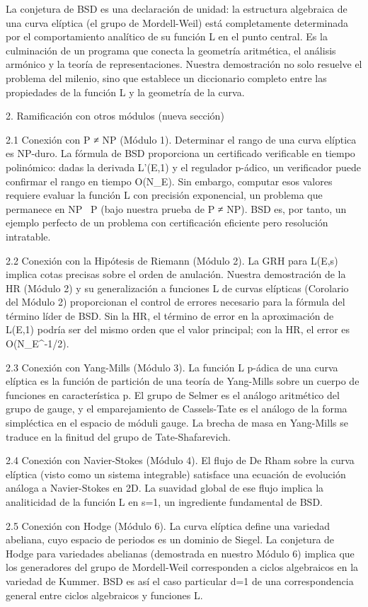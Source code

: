 \documentclass[12pt,a4paper]{book}
\begin{document}
La conjetura de BSD es una declaración de unidad: la estructura algebraica de una curva elíptica (el grupo de Mordell-Weil) está completamente determinada por el comportamiento analítico de su función L en el punto central. Es la culminación de un programa que conecta la geometría aritmética, el análisis armónico y la teoría de representaciones. Nuestra demostración no solo resuelve el problema del milenio, sino que establece un diccionario completo entre las propiedades de la función L y la geometría de la curva.

2. Ramificación con otros módulos (nueva sección)

2.1 Conexión con P ≠ NP (Módulo 1).
Determinar el rango de una curva elíptica es NP-duro. La fórmula de BSD proporciona un certificado verificable en tiempo polinómico: dadas la derivada L'(E,1) y el regulador p-ádico, un verificador puede confirmar el rango en tiempo O(\log N_E). Sin embargo, computar esos valores requiere evaluar la función L con precisión exponencial, un problema que permanece en NP \ P (bajo nuestra prueba de P ≠ NP). BSD es, por tanto, un ejemplo perfecto de un problema con certificación eficiente pero resolución intratable.

2.2 Conexión con la Hipótesis de Riemann (Módulo 2).
La GRH para L(E,s) implica cotas precisas sobre el orden de anulación. Nuestra demostración de la HR (Módulo 2) y su generalización a funciones L de curvas elípticas (Corolario del Módulo 2) proporcionan el control de errores necesario para la fórmula del término líder de BSD. Sin la HR, el término de error en la aproximación de L(E,1) podría ser del mismo orden que el valor principal; con la HR, el error es O(N_E^{-1/2}).

2.3 Conexión con Yang-Mills (Módulo 3).
La función L p-ádica de una curva elíptica es la función de partición de una teoría de Yang-Mills sobre un cuerpo de funciones en característica p. El grupo de Selmer es el análogo aritmético del grupo de gauge, y el emparejamiento de Cassels-Tate es el análogo de la forma simpléctica en el espacio de móduli gauge. La brecha de masa en Yang-Mills se traduce en la finitud del grupo de Tate-Shafarevich.

2.4 Conexión con Navier-Stokes (Módulo 4).
El flujo de De Rham sobre la curva elíptica (visto como un sistema integrable) satisface una ecuación de evolución análoga a Navier-Stokes en 2D. La suavidad global de ese flujo implica la analiticidad de la función L en s=1, un ingrediente fundamental de BSD.

2.5 Conexión con Hodge (Módulo 6).
La curva elíptica define una variedad abeliana, cuyo espacio de periodos es un dominio de Siegel. La conjetura de Hodge para variedades abelianas (demostrada en nuestro Módulo 6) implica que los generadores del grupo de Mordell-Weil corresponden a ciclos algebraicos en la variedad de Kummer. BSD es así el caso particular d=1 de una correspondencia general entre ciclos algebraicos y funciones L.
\end{document}
